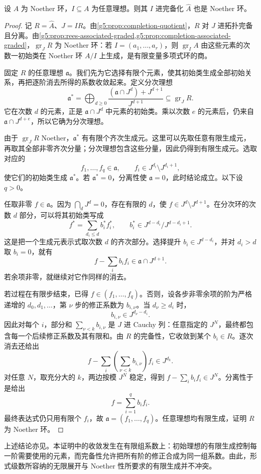 \begin{theorem}\label{g5:thm:completion-noetherian}
	设 \(A\) 为 Noether 环，\(I\subseteq A\) 为任意理想。则其 \(I\) 进完备化 \(\widehat A\) 也是 Noether 环。
\end{theorem}
\begin{proof}
	记 \(R=\widehat A\)、\(J=IR\)。由\cref{g5:prop:completion-quotient}，\(R\) 对 \(J\) 进拓扑完备且分离。由\cref{g5:prop:rees-associated-graded,g5:prop:completion-associated-graded}，\(\operatorname{gr}_J R\) 为 Noether 环：若 \(I=(a_1,\ldots,a_r)\)，则 \(\operatorname{gr}_I A\) 由这些元素的次数一初始类在 Noether 环 \(A/I\) 上生成，是有限变量多项式环的商。

	固定 \(R\) 的任意理想 \(\mathfrak a\)。我们先为它选择有限个元素，使其初始类生成全部初始关系，再把逐阶消去所得的系数收敛起来。定义分次理想
	\[
		\mathfrak a^*
		=\bigoplus_{d\geq0}
		\frac{(\mathfrak a\cap J^d)+J^{d+1}}{J^{d+1}}
		\subseteq\operatorname{gr}_J R.
	\]
	它在次数 \(d\) 的元素，正是 \(\mathfrak a\cap J^d\) 中元素的初始类。乘以次数 \(e\) 的元素后，仍来自 \(\mathfrak a\cap J^{d+e}\)，所以它确为分次理想。

	由于 \(\operatorname{gr}_J R\) Noether，\(\mathfrak a^*\) 有有限个齐次生成元。这里可以先取任意有限生成元，再取其全部非零齐次分量；分次理想包含这些分量，因此仍得到有限生成元。选取对应的
	\[
		f_1,\ldots,f_q\in\mathfrak a,
		\qquad
		f_i\in J^{d_i}\setminus J^{d_i+1},
	\]
	使它们的初始类生成 \(\mathfrak a^*\)。若 \(\mathfrak a^*=0\)，分离性使 \(\mathfrak a=0\)，此时结论成立。以下设 \(q>0\)。

	任取非零 \(f\in\mathfrak a\)。因为 \(\bigcap_dJ^d=0\)，存在有限的 \(d\)，使 \(f\in J^d\setminus J^{d+1}\)。在分次环的次数 \(d\) 部分，可以将其初始类写成
	\[
		f^*=\sum_{d_i\leq d} b_i^* f_i^*,
		\qquad
		b_i^*\in J^{d-d_i}/J^{d-d_i+1}.
	\]
	这是把一个生成元表示式取次数 \(d\) 的齐次部分。选择提升 \(b_i\in J^{d-d_i}\)，并对 \(d_i>d\) 取 \(b_i=0\)，就有
	\[
		f-\sum_i b_i f_i\in\mathfrak a\cap J^{d+1}.
	\]
	若余项非零，就继续对它作同样的消去。

	若过程在有限步结束，已得 \(f\in(f_1,\ldots,f_q)\)。否则，设各步非零余项的阶为严格递增的 \(d_0,d_1,\ldots\)，第 \(\nu\) 步的修正系数为 \(b_{i,\nu}\)。当 \(d_\nu\geq d_i\) 时，
	\[
		b_{i,\nu}\in J^{d_\nu-d_i}.
	\]
	因此对每个 \(i\)，部分和 \(\sum_{\nu<k}b_{i,\nu}\) 是 \(J\) 进 Cauchy 列：任意指定的 \(J^N\)，最终都包含每一个后续修正系数及其有限和。由 \(R\) 的完备性，它收敛到某个 \(b_i\in R\)。逐次消去还给出
	\[
		f-\sum_i\left(\sum_{\nu<k}b_{i,\nu}\right)f_i
		\in J^{d_k}.
	\]
	对任意 \(N\)，取充分大的 \(k\)，两边按模 \(J^N\) 稳定，得到 \(f-\sum_i b_i f_i\in J^N\)。分离性于是给出
	\[
		f=\sum_{i=1}^q b_i f_i.
	\]
	最终表达式仍只用有限个 \(f_i\)，故 \(\mathfrak a=(f_1,\ldots,f_q)\)。任意理想均有限生成，证明 \(R\) 为 Noether 环。
\end{proof}

上述结论亦见\cite[第8节，定理8.12，第61页]{Matsumura1989}。本证明中的收敛发生在有限组系数上：初始理想的有限生成控制每一阶需要使用的元素，而完备性允许把所有阶的修正合成为同一组系数。由此，形式级数所容纳的无限展开与 Noether 性所要求的有限生成并不冲突。
